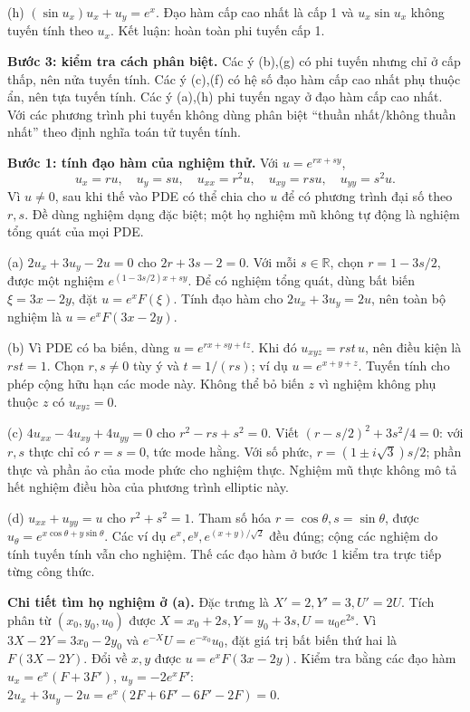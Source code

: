(h) $(\sin u_x)u_x+u_y=e^x$. Đạo hàm cấp cao nhất là cấp 1 và $u_x\sin u_x$ không tuyến tính theo $u_x$. Kết luận: hoàn toàn phi tuyến cấp 1.

\textbf{Bước 3: kiểm tra cách phân biệt.} Các ý (b),(g) có phi tuyến nhưng chỉ ở cấp thấp, nên nửa tuyến tính. Các ý (c),(f) có hệ số đạo hàm cấp cao nhất phụ thuộc ẩn, nên tựa tuyến tính. Các ý (a),(h) phi tuyến ngay ở đạo hàm cấp cao nhất. Với các phương trình phi tuyến không dùng phân biệt ``thuần nhất/không thuần nhất'' theo định nghĩa toán tử tuyến tính.

\textbf{Bước 1: tính đạo hàm của nghiệm thử.} Với $u=e^{rx+sy}$,
\[u_x=ru,\quad u_y=su,\quad u_{xx}=r^2u,\quad u_{xy}=rsu,\quad u_{yy}=s^2u.\]
Vì $u\ne0$, sau khi thế vào PDE có thể chia cho $u$ để có phương trình đại số theo $r,s$. Đề dùng nghiệm dạng đặc biệt; một họ nghiệm mũ không tự động là nghiệm tổng quát của mọi PDE.

(a) $2u_x+3u_y-2u=0$ cho $2r+3s-2=0$. Với mỗi $s\in\mathbb R$, chọn $r=1-3s/2$, được một nghiệm $e^{(1-3s/2)x+sy}$. Để có nghiệm tổng quát, dùng bất biến $\xi=3x-2y$, đặt $u=e^xF(\xi)$. Tính đạo hàm cho $2u_x+3u_y=2u$, nên toàn bộ nghiệm là $u=e^xF(3x-2y)$.

(b) Vì PDE có ba biến, dùng $u=e^{rx+sy+tz}$. Khi đó $u_{xyz}=rst\,u$, nên điều kiện là $rst=1$. Chọn $r,s\ne0$ tùy ý và $t=1/(rs)$; ví dụ $u=e^{x+y+z}$. Tuyến tính cho phép cộng hữu hạn các mode này. Không thể bỏ biến $z$ vì nghiệm không phụ thuộc $z$ có $u_{xyz}=0$.

(c) $4u_{xx}-4u_{xy}+4u_{yy}=0$ cho $r^2-rs+s^2=0$. Viết $(r-s/2)^2+3s^2/4=0$: với $r,s$ thực chỉ có $r=s=0$, tức mode hằng. Với số phức, $r=(1\pm i\sqrt3)s/2$; phần thực và phần ảo của mode phức cho nghiệm thực. Nghiệm mũ thực không mô tả hết nghiệm điều hòa của phương trình elliptic này.

(d) $u_{xx}+u_{yy}=u$ cho $r^2+s^2=1$. Tham số hóa $r=\cos\theta,s=\sin\theta$, được $u_\theta=e^{x\cos\theta+y\sin\theta}$. Các ví dụ $e^x,e^y,e^{(x+y)/\sqrt2}$ đều đúng; cộng các nghiệm do tính tuyến tính vẫn cho nghiệm. Thế các đạo hàm ở bước 1 kiểm tra trực tiếp từng công thức.

\textbf{Chi tiết tìm họ nghiệm ở (a).} Đặc trưng là $X'=2,Y'=3,U'=2U$. Tích phân từ $(x_0,y_0,u_0)$ được $X=x_0+2s,Y=y_0+3s,U=u_0e^{2s}$. Vì $3X-2Y=3x_0-2y_0$ và $e^{-X}U=e^{-x_0}u_0$, đặt giá trị bất biến thứ hai là $F(3X-2Y)$. Đổi về $x,y$ được $u=e^xF(3x-2y)$. Kiểm tra bằng các đạo hàm $u_x=e^x(F+3F')$, $u_y=-2e^xF'$: $2u_x+3u_y-2u=e^x(2F+6F'-6F'-2F)=0$.


